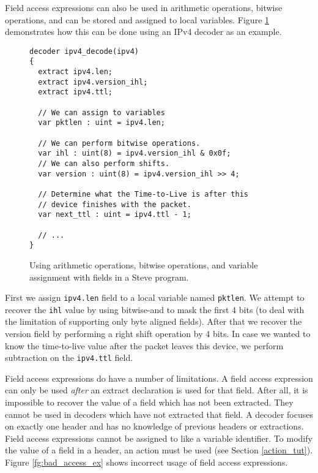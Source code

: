Field access expressions can also be used in arithmetic operations, bitwise operations, and can be stored and assigned to local variables. Figure \ref{fg:assign_arith_ex} demonstrates how this can be done using an IPv4 decoder as an example.

\begin{figure}[ht]
\begin{lstlisting}
decoder ipv4_decode(ipv4)
{
  extract ipv4.len;
  extract ipv4.version_ihl;
  extract ipv4.ttl;
  
  // We can assign to variables
  var pktlen : uint = ipv4.len;
  
  // We can perform bitwise operations.
  var ihl : uint(8) = ipv4.version_ihl & 0x0f;
  // We can also perform shifts.
  var version : uint(8) = ipv4.version_ihl >> 4;
  
  // Determine what the Time-to-Live is after this
  // device finishes with the packet.
  var next_ttl : uint = ipv4.ttl - 1;
  
  // ...
}
\end{lstlisting}
\caption{Using arithmetic operations, bitwise operations, and variable assignment with fields in a Steve program.}
\label{fg:assign_arith_ex}
\end{figure}

First we assign \texttt{ipv4.len} field to a local variable named \texttt{pktlen}. We attempt to recover the \texttt{ihl} value by using bitwise-and to mask the first 4 bits (to deal with the limitation of supporting only byte aligned fields). After that we recover the version field by performing a right shift operation by 4 bits. In case we wanted to know the time-to-live value after the packet leaves this device, we perform subtraction on the \texttt{ipv4.ttl} field.

Field access expressions do have a number of limitations. A field access expression can only be used \textit{after} an extract declaration is used for that field. After all, it is impossible to recover the value of a field which has not been extracted. They cannot be used in decoders which have not extracted that field. A decoder focuses on exactly one header and has no knowledge of previous headers or extractions. Field access expressions cannot be assigned to like a variable identifier. To modify the value of a field in a header, an action must be used (see Section \ref{action_tut}). Figure \ref{fg:bad_access_ex} shows incorrect usage of field access expressions.

